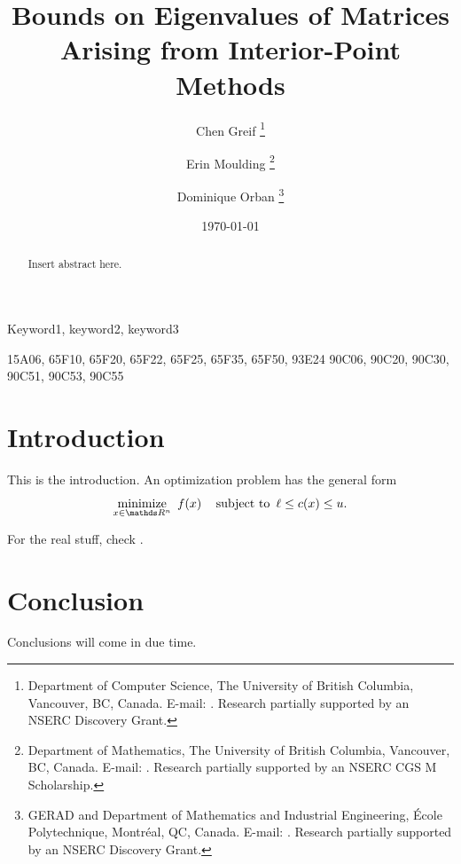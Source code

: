 \documentclass[review]{siamart251216}  %
\title{
  Bounds on Eigenvalues of Matrices Arising from Interior-Point Methods%
}
\author{
  Chen Greif%
  \thanks{%
    Department of Computer Science,
    The University of British Columbia,
    Vancouver, BC, Canada.
    E-mail: \mailto{greif@cs.ubc.ca}.
    Research partially supported by an NSERC Discovery Grant.
  }
  \and
  Erin Moulding%
  \thanks{%
    Department of Mathematics,
    The University of British Columbia,
    Vancouver, BC, Canada.
    E-mail: \mailto{moulding@math.ubc.ca}.
    Research partially supported by an NSERC CGS M Scholarship.
  }
  \and
  Dominique Orban%
  \thanks{%
    GERAD and Department of Mathematics and Industrial Engineering,
    \'Ecole Polytechnique, Montr\'eal, QC, Canada.
    E-mail: \mailto{dominique.orban@gerad.ca}.
    Research partially supported by an NSERC Discovery Grant.
  }
}
\date{\today}
\begin{document}
  \linenumbers
  \maketitle

  \thispagestyle{firstpage}
  \pagestyle{myheadings}

  \begin{abstract}
    Insert abstract here. 
  \end{abstract}

  \begin{keywords}
    Keyword1, keyword2, keyword3
  \end{keywords}

  \begin{AMS}
    15A06,  %
    65F10,  %
    65F20,  %
    65F22,  %
    65F25,  %
    65F35,  %
    65F50,  %
    93E24   %
    90C06,  %
    90C20,  %
    90C30,  %
    90C51,  %
    90C53,  %
    90C55   %
  \end{AMS}

  \tableofcontents
  \listoftodos\relax

  \section{Introduction}

  This is the introduction. An optimization problem has the general form
  \begin{equation}
    \label{eq:opt-problem}
    \minimize{x \in \R^n} \ f(x) \quad \st \ \ell \leq c(x) \leq u.
  \end{equation}

  For the real stuff, check \cite{wright-orban-2002}.

  \section{Conclusion}

  Conclusions will come in due time. 

  
  
\end{document}
